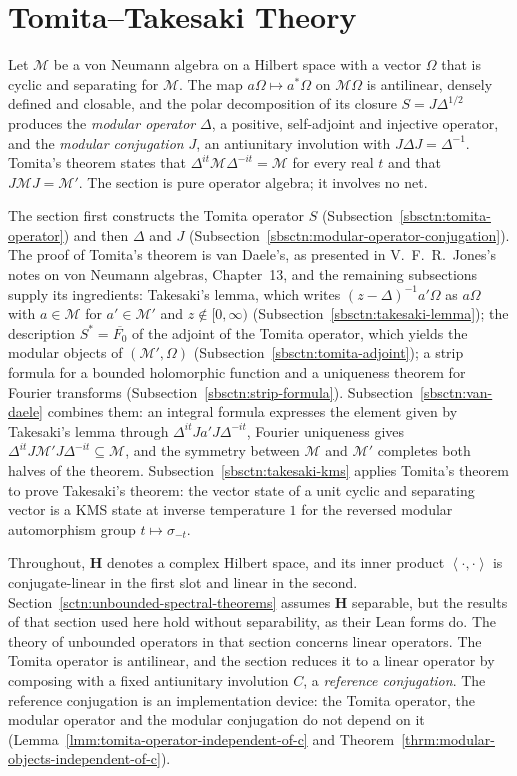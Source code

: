 \section{Tomita--Takesaki Theory}\label{sctn:tomita-takesaki}

Let $\mathcal{M}$ be a von Neumann algebra on a Hilbert space with a vector $\Omega$ that is cyclic and separating for $\mathcal{M}$. The map $a\Omega \mapsto a^*\Omega$ on $\mathcal{M}\Omega$ is antilinear, densely defined and closable, and the polar decomposition of its closure $S = J\Delta^{1/2}$ produces the \emph{modular operator} $\Delta$, a positive, self-adjoint and injective operator, and the \emph{modular conjugation} $J$, an antiunitary involution with $J\Delta J = \Delta^{-1}$. Tomita's theorem states that $\Delta^{it}\mathcal{M}\Delta^{-it} = \mathcal{M}$ for every real $t$ and that $J\mathcal{M}J = \mathcal{M}'$. The section is pure operator algebra; it involves no net.

The section first constructs the Tomita operator $S$ (Subsection~\ref{sbsctn:tomita-operator}) and then $\Delta$ and $J$ (Subsection~\ref{sbsctn:modular-operator-conjugation}). The proof of Tomita's theorem is van Daele's, as presented in V.~F.~R.~Jones's notes on von Neumann algebras, Chapter~13, and the remaining subsections supply its ingredients: Takesaki's lemma, which writes $(z - \Delta)^{-1}a'\Omega$ as $a\Omega$ with $a \in \mathcal{M}$ for $a' \in \mathcal{M}'$ and $z \notin [0, \infty)$ (Subsection~\ref{sbsctn:takesaki-lemma}); the description $S^* = \overline{F_0}$ of the adjoint of the Tomita operator, which yields the modular objects of $(\mathcal{M}', \Omega)$ (Subsection~\ref{sbsctn:tomita-adjoint}); a strip formula for a bounded holomorphic function and a uniqueness theorem for Fourier transforms (Subsection~\ref{sbsctn:strip-formula}). Subsection~\ref{sbsctn:van-daele} combines them: an integral formula expresses the element given by Takesaki's lemma through $\Delta^{it}Ja'J\Delta^{-it}$, Fourier uniqueness gives $\Delta^{it}J\mathcal{M}'J\Delta^{-it} \subseteq \mathcal{M}$, and the symmetry between $\mathcal{M}$ and $\mathcal{M}'$ completes both halves of the theorem. Subsection~\ref{sbsctn:takesaki-kms} applies Tomita's theorem to prove Takesaki's theorem: the vector state of a unit cyclic and separating vector is a KMS state at inverse temperature $1$ for the reversed modular automorphism group $t \mapsto \sigma_{-t}$.

Throughout, $\mathbf{H}$ denotes a complex Hilbert space, and its inner product $\left< \cdot, \cdot \right>$ is conjugate-linear in the first slot and linear in the second. Section~\ref{sctn:unbounded-spectral-theorems} assumes $\mathbf{H}$ separable, but the results of that section used here hold without separability, as their Lean forms do. The theory of unbounded operators in that section concerns linear operators. The Tomita operator is antilinear, and the section reduces it to a linear operator by composing with a fixed antiunitary involution $C$, a \emph{reference conjugation}. The reference conjugation is an implementation device: the Tomita operator, the modular operator and the modular conjugation do not depend on it (Lemma~\ref{lmm:tomita-operator-independent-of-c} and Theorem~\ref{thrm:modular-objects-independent-of-c}).


